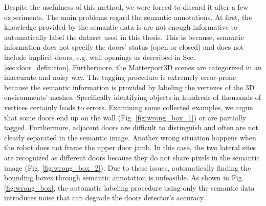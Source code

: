 Despite the usefulness of this method, we were forced to discard it after a few experiments. The main problems regard the semantic annotations. At first,  the knowledge provided by the semantic data is are not enough informative to automatically label the dataset used in this thesis. This is because, semantic information does not specify the doors' status (open or closed) and does not include implicit doors, e.g. wall openings as described in Sec. \ref{sec:door_definition}. Furthermore, the Matterport3D scenes are categorized in an inaccurate and noisy way. The tagging procedure is extremely error-prone because the semantic information is provided by labeling the vertexes of the 3D environments' meshes. Specifically identifying objects in hundreds of thousands of vertices certainly leads to errors. Examining some collected examples, we argue that some doors end up on the wall (Fig. \ref{fig:wrong_box_1}) or are partially tagged. Furthermore, adjacent doors are difficult to distinguish and often are not clearly separated in the semantic image. Another wrong situation happens when the robot does not frame the upper door jamb. In this case, the two lateral sites are recognized as different doors because they do not share pixels in the semantic image (Fig. \ref{fig:wrong_box_2}). Due to these issues, automatically finding the bounding boxes through semantic annotation is unfeasible. As shown in Fig. \ref{fig:wrong_box}, the automatic labeling procedure using only the semantic data introduces noise that can degrade the doors detector's accuracy.

